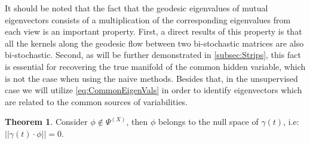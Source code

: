 \documentclass[]{article}
\theoremstyle{definition}
\newtheorem{theorem}{Theorem}
\begin{document}
	It should be noted that the fact that the geodesic eigenvalues of mutual eigenvectors consists of a multiplication of the corresponding eigenvalues from each view is an important property. First, a direct results of this property is that all the kernels along the geodesic flow between two bi-stochastic matrices are also bi-stochastic. Second, as will be further demonstrated in \ref{subsec:Strips}, this fact is essential for recovering the true manifold of the common hidden variable, which is not the case when using the naive methods. Besides that, in the unsupervised case we will utilize \ref{eq:CommonEigenVals} in order to identify eigenvectors which are related to the common sources of variabilities.\\
	
	\begin{theorem}
		Consider $\phi \notin \Psi^{(X)}$, then $\phi$ belongs to the null space of $\gamma(t)$, i.e: $||\gamma(t) \cdot \phi|| = 0$.
 	\end{theorem}
 
\end{document}
